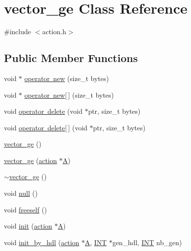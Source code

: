\hypertarget{classvector__ge}{}\section{vector\+\_\+ge Class Reference}
\label{classvector__ge}


{\ttfamily \#include $<$action.\+h$>$}

\subsection*{Public Member Functions}
\begin{DoxyCompactItemize}
\item 
void $\ast$ \mbox{\hyperlink{classvector__ge_a3ac4408bbd6f0a54b9243dcc8d755a3f}{operator new}} (size\+\_\+t bytes)
\item 
void $\ast$ \mbox{\hyperlink{classvector__ge_adc2ed4b444b4519629605205d545c9c6}{operator new\mbox{[}$\,$\mbox{]}}} (size\+\_\+t bytes)
\item 
void \mbox{\hyperlink{classvector__ge_a614480102054826a0b1223433636d97a}{operator delete}} (void $\ast$ptr, size\+\_\+t bytes)
\item 
void \mbox{\hyperlink{classvector__ge_a31d292f0a332fbe10f4417fc5b60cbdb}{operator delete\mbox{[}$\,$\mbox{]}}} (void $\ast$ptr, size\+\_\+t bytes)
\item 
\mbox{\hyperlink{classvector__ge_a11d517694ef186d9e86545caf1eba567}{vector\+\_\+ge}} ()
\item 
\mbox{\hyperlink{classvector__ge_a407628898bce137dfed7252451125cf8}{vector\+\_\+ge}} (\mbox{\hyperlink{classaction}{action}} $\ast$\mbox{\hyperlink{classvector__ge_a0b3cff149005f761255906417b1f6d35}{A}})
\item 
\mbox{\hyperlink{classvector__ge_a8462806b80e77ad2a1202f7b2f2a8d08}{$\sim$vector\+\_\+ge}} ()
\item 
void \mbox{\hyperlink{classvector__ge_a159c9e23be38af45c71c20730e764257}{null}} ()
\item 
void \mbox{\hyperlink{classvector__ge_aa002e4b715cc73a9b8b367d29700b452}{freeself}} ()
\item 
void \mbox{\hyperlink{classvector__ge_afe1d6befd1f1501e6be34afbaa9d30a8}{init}} (\mbox{\hyperlink{classaction}{action}} $\ast$\mbox{\hyperlink{classvector__ge_a0b3cff149005f761255906417b1f6d35}{A}})
\item 
void \mbox{\hyperlink{classvector__ge_a8475939c05dfe3cae6b07bb2a83f2029}{init\+\_\+by\+\_\+hdl}} (\mbox{\hyperlink{classaction}{action}} $\ast$\mbox{\hyperlink{classvector__ge_a0b3cff149005f761255906417b1f6d35}{A}}, \mbox{\hyperlink{galois_8h_a09fddde158a3a20bd2dcadb609de11dc}{I\+NT}} $\ast$gen\+\_\+hdl, \mbox{\hyperlink{galois_8h_a09fddde158a3a20bd2dcadb609de11dc}{I\+NT}} nb\+\_\+gen)

\end{DoxyCompactItemize}
